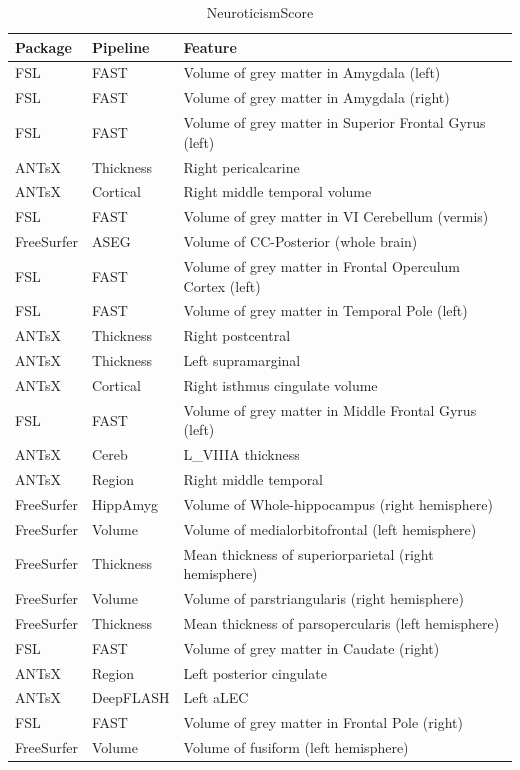 \documentclass[
  10pt,
]{article}
\begin{document}
\begin{table}

\caption{\label{tab:compare-predictions}NeuroticismScore}
\centering
\begin{tabular}[t]{lll}
\toprule
Package & Pipeline & Feature\\
\midrule
FSL & FAST & Volume of grey matter in Amygdala (left)\\
FSL & FAST & Volume of grey matter in Amygdala (right)\\
FSL & FAST & Volume of grey matter in Superior Frontal Gyrus (left)\\
ANTsX & Thickness & Right pericalcarine\\
ANTsX & Cortical & Right middle temporal volume\\
\addlinespace
FSL & FAST & Volume of grey matter in VI Cerebellum (vermis)\\
FreeSurfer & ASEG & Volume of CC-Posterior (whole brain)\\
FSL & FAST & Volume of grey matter in Frontal Operculum Cortex (left)\\
FSL & FAST & Volume of grey matter in Temporal Pole (left)\\
ANTsX & Thickness & Right postcentral\\
\addlinespace
ANTsX & Thickness & Left supramarginal\\
ANTsX & Cortical & Right isthmus cingulate volume\\
FSL & FAST & Volume of grey matter in Middle Frontal Gyrus (left)\\
ANTsX & Cereb & L\_VIIIA thickness\\
ANTsX & Region & Right middle temporal\\
\addlinespace
FreeSurfer & HippAmyg & Volume of Whole-hippocampus (right hemisphere)\\
FreeSurfer & Volume & Volume of medialorbitofrontal (left hemisphere)\\
FreeSurfer & Thickness & Mean thickness of superiorparietal (right hemisphere)\\
FreeSurfer & Volume & Volume of parstriangularis (right hemisphere)\\
FreeSurfer & Thickness & Mean thickness of parsopercularis (left hemisphere)\\
\addlinespace
FSL & FAST & Volume of grey matter in Caudate (right)\\
ANTsX & Region & Left posterior cingulate\\
ANTsX & DeepFLASH & Left aLEC\\
FSL & FAST & Volume of grey matter in Frontal Pole (right)\\
FreeSurfer & Volume & Volume of fusiform (left hemisphere)\\
\bottomrule
\end{tabular}
\end{table}
\end{document}
